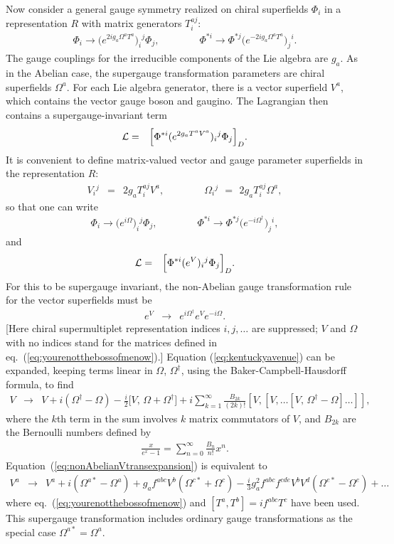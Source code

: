 \documentclass[11pt]{article}
\def\beq{\begin{eqnarray}}
\def\eeq{\end{eqnarray}}
\begin{document}
Now consider a general gauge symmetry realized on chiral superfields $\Phi_i$ in a representation $R$
with matrix generators $T^{aj}_i$:
\beq
\Phi_i \rightarrow \bigl (e^{2 i g_a \Omega^a T^a} \bigr )_i{}^j 
\Phi_j,
\qquad\qquad
\Phi^{*i} \rightarrow \Phi^{*j}
\bigl (e^{-2 i g_a \Omega^a T^a} \bigr )_j{}^i.
\eeq
The gauge couplings for the irreducible components of the Lie algebra are $g_a$. As in the Abelian case, the supergauge transformation parameters are chiral superfields $\Omega^a$.
For each Lie algebra generator, there is a
vector superfield $V^a$, which contains the vector gauge boson and gaugino. 
The Lagrangian then contains a supergauge-invariant term
\beq
{\cal L} &=& \Bigl [ \Phi^{*i} (e^{2 g_a T^a V^a})_i{}^j \Phi_j \Bigr ]_D.
\eeq
It is convenient to define matrix-valued vector and gauge parameter 
superfields in the representation $R$:
\beq
V_i{}^j &=& 2 g_a T_i^{aj} V^a ,
\qquad\qquad
\Omega_i{}^j \>\,=\,\> 2 g_a T_i^{aj} \Omega^a ,
\label{eq:yourenotthebossofmenow}
\eeq
so that one can write
\beq
\Phi_i \rightarrow \bigl (e^{i \Omega} \bigr )_i{}^j 
\Phi_j,
\qquad\qquad
\Phi^{*i} \rightarrow \Phi^{*j}
\bigl (e^{-i \Omega^\dagger} \bigr )_j{}^i ,
\eeq
and
\beq
{\cal L} &=& \Bigl [ \Phi^{*i} (e^{V})_i{}^j \Phi_j \Bigr ]_D.
\label{eq:bigbadbeluva}
\eeq
For this to be supergauge invariant, 
the non-Abelian gauge transformation rule for the vector superfields must be
\beq
e^V &\rightarrow& e^{i \Omega^\dagger} e^V e^{-i\Omega}
.
\label{eq:kentuckyavenue}
\eeq
[Here chiral supermultiplet representation indices $i,j,\ldots$ are suppressed;
$V$ and $\Omega$ with no indices stand for the matrices defined in 
eq.~(\ref{eq:yourenotthebossofmenow}).]
Equation (\ref{eq:kentuckyavenue}) can be expanded, keeping terms linear in
$\Omega$, $\Omega^\dagger$, using the Baker-Campbell-Hausdorff formula, to find
\beq
V &\rightarrow & V + i (\Omega^\dagger - \Omega) 
- \frac{i}{2} \bigl [V,\, \Omega + \Omega^\dagger ] 
+ i\sum_{k=1}^{\infty}
\frac{B_{2k}}{(2k)!} \left [ V, \left [ V,\ldots \left [V,\, \Omega^\dagger - \Omega \right ]\ldots \right]\right]
,
\phantom{xxx}
\label{eq:nonAbelianVtransexpansion}
\eeq
where the $k$th term in the sum involves $k$ matrix commutators of 
$V$, and $B_{2k}$ are the Bernoulli numbers defined by
\beq
\frac{x}{e^x - 1} = \sum_{n=0}^\infty \frac{B_n}{n!} x^n.
\eeq
Equation~(\ref{eq:nonAbelianVtransexpansion}) is equivalent to
\beq
V^a &\rightarrow& V^a + i (\Omega^{a*} - \Omega^a)
+ g_a f^{abc} V^b (\Omega^{c*} + \Omega^c)
- \frac{i}{3} g_a^2 f^{abc} f^{cde} V^b V^d (\Omega^{e*} - \Omega^e) + 
\ldots \phantom{xxx}
\label{eq:nonAbelianVtransexpansiona}
\eeq
where eq.~(\ref{eq:yourenotthebossofmenow}) and $[T^a, T^b] = i f^{abc} T^c$ have been used.
This supergauge transformation includes ordinary gauge transformations as 
the special case
$\Omega^{a*} = \Omega^a$. 
\end{document}
